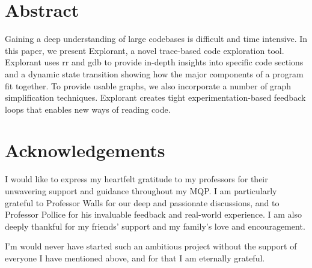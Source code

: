 \newpage %
\setcounter{page}{1} %

\section*{Abstract} %

\noindent Gaining a deep understanding of large codebases is difficult and time intensive. In this paper, we present Explorant, a novel trace-based code exploration tool. Explorant uses rr and gdb to provide in-depth insights into specific code sections and a dynamic state transition showing how the major components of a program fit together. To provide usable graphs, we also incorporate a number of graph simplification techniques. Explorant creates tight experimentation-based feedback loops that enables new ways of reading code.  

\newpage %
\section*{Acknowledgements} %
I would like to express my heartfelt gratitude to my professors for their unwavering support and guidance throughout my MQP. I am particularly grateful to Professor Walls for our deep and passionate discussions, and to Professor Pollice for his invaluable feedback and real-world experience. I am also deeply thankful for my friends' support and my family's love and encouragement.

I'm would never have started such an ambitious project without the support of everyone I have mentioned above, and for that I am eternally grateful. 


\newpage %
\tableofcontents %
\listoftables %
\listoffigures %

